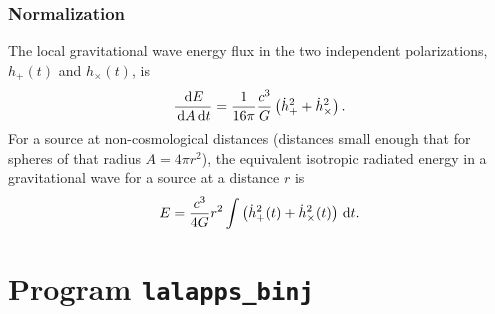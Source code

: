 \documentclass[10pt]{article}
\newcommand{\prog}[1]{\texttt{#1}}
\begin{document}
\subsubsection{Normalization}


The local gravitational wave energy flux in the two independent
polarizations, \(h_{+}(t)\) and \(h_{\times}(t)\), is \cite{isaacson1968}
\begin{equation}
\frac{\,\mathrm{d} E}{\,\mathrm{d} A \,\mathrm{d} t}
   = \frac{1}{16 \pi} \frac{c^{3}}{G} \left( \dot{h}_{+}^{2} +
   \dot{h}_{\times}^{2} \right).
\end{equation}
For a source at non-cosmological distances (distances small enough that for
spheres of that radius \(A = 4 \pi r^{2}\)), the equivalent isotropic
radiated energy in a gravitational wave for a source at a distance \(r\) is
\begin{equation}
E
   = \frac{c^{3}}{4 G} r^{2} \int \left( \dot{h}_{+}^{2}(t) +
   \dot{h}_{\times}^{2}(t) \right) \,\mathrm{d} t.
\end{equation}


\section{Program \prog{lalapps\_binj}}
\label{program:lalapps-binj}
\end{document}
